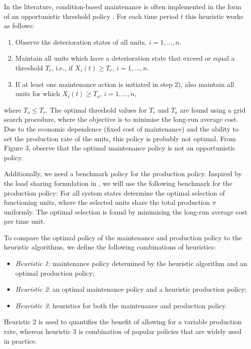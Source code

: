 \documentclass[a4paper,12pt]{article}
\begin{document}
In the literature, condition-based maintenance is often implemented in the form of an opportunistic threshold policy \citep{ZHANG2015176, ZHOU2009361}. For each time period $t$ this heuristic works as follows: 
\begin{enumerate}[1)]
	\item Observe the deterioration states of all units, $i = 1,\dots, n$.
	\item Maintain all units which have a deterioration state that exceed or equal a threshold $T_r$, i.e., if $X_i(t) \geq T_r$, $i = 1, \dots, n$.
	\item If at least one maintenance action is initiated in step 2), also maintain all units for which $X_i(t) \geq T_o$, $i = 1, \dots, n$,
\end{enumerate}
where $T_o \leq T_r$. The optimal threshold values for $T_r$ and $T_o$ are found using a grid search procedure, where the objective is to minimise the long-run average cost. Due to the economic dependence (fixed cost of maintenance) and the ability to set the production rate of the units, this policy is probably not optimal. From Figure 3, observe that the optimal maintenance policy is not an opportunistic policy.

Additionally, we need a benchmark policy for the production policy. Inspired by the load sharing formulation in \cite{OLDEKEIZER2018319}, we will use the following benchmark for the production policy: For all system states determine the optimal selection of functioning units, where the selected units share the total production $\pi$ uniformly. The optimal selection is found by minimising the long-run average  cost per time unit.

To compare the optimal policy of the maintenance and production policy to the heuristic algorithms, we define the following combinations of heuristics:
\begin{itemize}
	\item \textit{Heuristic 1}: maintenance policy determined by the heuristic algorithm and an optimal production policy;
	\item \textit{Heuristic 2}: an optimal maintenance policy and a heuristic production policy;
	\item \textit{Heuristic 3}: heuristics for both the maintenance and production policy.
\end{itemize}
Heuristic 2 is used to quantifies the benefit of allowing for a variable production rate, whereas heuristic 3 is combination of popular policies that are widely used in practice. 
\end{document}
